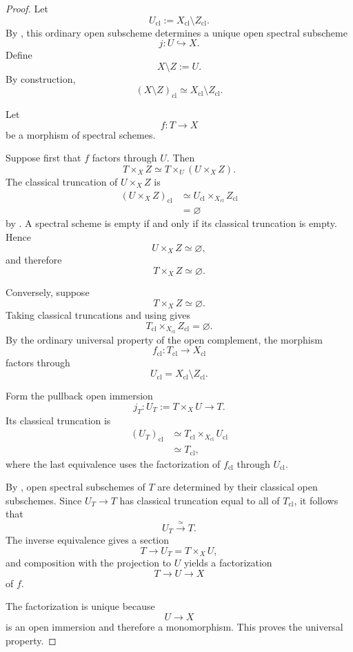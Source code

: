 \begin{proof}
Let
\[
    U_{\mathrm{cl}}
    :=
    X_{\mathrm{cl}}
    \setminus
    Z_{\mathrm{cl}}.
\]
By
,
this ordinary open subscheme determines a unique open spectral subscheme
\[
    j
    \colon
    U
    \hookrightarrow
    X.
\]
Define
\[
    X\setminus Z
    :=
    U.
\]
By construction,
\[
    (X\setminus Z)_{\mathrm{cl}}
    \simeq
    X_{\mathrm{cl}}
    \setminus
    Z_{\mathrm{cl}}.
\]

Let
\[
    f
    \colon
    T
    \longrightarrow
    X
\]
be a morphism of spectral schemes.

Suppose first that \(f\) factors through \(U\). Then
\[
    T\times_XZ
    \simeq
    T\times_U(U\times_XZ).
\]
The classical truncation of \(U\times_XZ\) is
\[
\begin{aligned}
    (U\times_XZ)_{\mathrm{cl}}
    &\simeq
    U_{\mathrm{cl}}
    \times_{X_{\mathrm{cl}}}
    Z_{\mathrm{cl}}
    \\
    &=
    \varnothing
\end{aligned}
\]
by
.
A spectral scheme is empty if and only if its classical truncation is
empty. Hence
\[
    U\times_XZ
    \simeq
    \varnothing,
\]
and therefore
\[
    T\times_XZ
    \simeq
    \varnothing.
\]

Conversely, suppose
\[
    T\times_XZ
    \simeq
    \varnothing.
\]
Taking classical truncations and using
gives
\[
    T_{\mathrm{cl}}
    \times_{X_{\mathrm{cl}}}
    Z_{\mathrm{cl}}
    =
    \varnothing.
\]
By the ordinary universal property of the open complement, the morphism
\[
    f_{\mathrm{cl}}
    \colon
    T_{\mathrm{cl}}
    \longrightarrow
    X_{\mathrm{cl}}
\]
factors through
\[
    U_{\mathrm{cl}}
    =
    X_{\mathrm{cl}}\setminus Z_{\mathrm{cl}}.
\]

Form the pullback open immersion
\[
    j_T
    \colon
    U_T
    :=
    T\times_XU
    \longrightarrow
    T.
\]
Its classical truncation is
\[
\begin{aligned}
    (U_T)_{\mathrm{cl}}
    &\simeq
    T_{\mathrm{cl}}
    \times_{X_{\mathrm{cl}}}
    U_{\mathrm{cl}}
    \\
    &\simeq
    T_{\mathrm{cl}},
\end{aligned}
\]
where the last equivalence uses the factorization of \(f_{\mathrm{cl}}\)
through \(U_{\mathrm{cl}}\).

By
,
open spectral subschemes of \(T\) are determined by their classical open
subschemes. Since \(U_T\to T\) has classical truncation equal to all of
\(T_{\mathrm{cl}}\), it follows that
\[
    U_T
    \xrightarrow{\simeq}
    T.
\]
The inverse equivalence gives a section
\[
    T
    \longrightarrow
    U_T
    =
    T\times_XU,
\]
and composition with the projection to \(U\) yields a factorization
\[
    T
    \longrightarrow
    U
    \longrightarrow
    X
\]
of \(f\).

The factorization is unique because
\[
    U
    \longrightarrow
    X
\]
is an open immersion and therefore a monomorphism. This proves the
universal property.
\end{proof}


